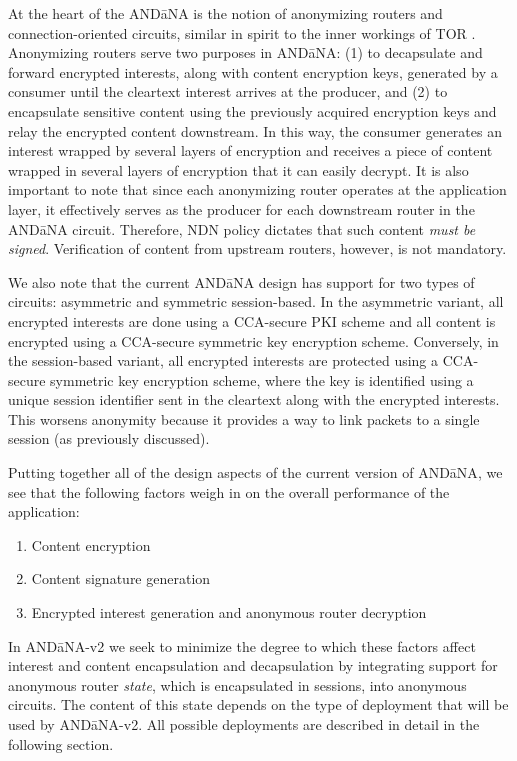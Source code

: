 \documentclass[10pt]{article}
\begin{document}
At the heart of the {\sf AND\=aNA} is the notion of anonymizing routers and connection-oriented circuits, similar in spirit to the inner workings of TOR \cite{tor}. Anonymizing routers serve two purposes in {\sf AND\=aNA}: (1) to decapsulate and forward encrypted interests, along with content encryption keys, generated by a consumer until the cleartext interest arrives at the producer, and (2) to encapsulate sensitive content using the previously acquired encryption keys and relay the encrypted content downstream. In this way, the consumer generates an interest wrapped by several layers of encryption and receives a piece of content wrapped in several layers of encryption that it can easily decrypt. It is also important to note that since each anonymizing router operates at the application layer, it effectively serves as the producer for each downstream router in the {\sf AND\=aNA} circuit. Therefore, NDN policy dictates that such content \emph{must be signed}. Verification of content from upstream routers, however, is not mandatory. 

We also note that the current {\sf AND\=aNA} design has support for two types of circuits: asymmetric and symmetric session-based. In the asymmetric variant, all encrypted interests are done using a CCA-secure PKI scheme and all content is encrypted using a CCA-secure symmetric key encryption scheme. Conversely, in the session-based variant, all encrypted interests are protected using a CCA-secure symmetric key encryption scheme, where the key is identified using a unique session identifier sent in the cleartext along with the encrypted interests. This worsens anonymity because it provides a way to link packets to a single session (as previously discussed).

Putting together all of the design aspects of the current version of {\sf AND\=aNA}, we see that the following factors weigh in on the overall performance of the application:
\begin{enumerate}
  \item Content encryption
  \item Content signature generation
  \item Encrypted interest generation and anonymous router decryption
\end{enumerate} 
In {\sf AND\=aNA-v2} we seek to minimize the degree to which these factors affect interest and content encapsulation and decapsulation by integrating support for anonymous router \emph{state}, which is encapsulated in sessions, into anonymous circuits. The content of this state depends on the type of deployment that will be used by {\sf AND\=aNA-v2}. All possible deployments are described in detail in the following section.
\end{document}
